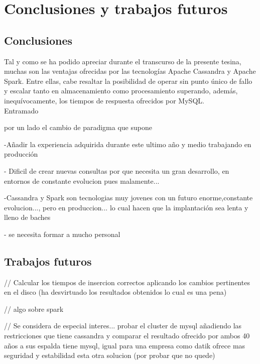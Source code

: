 
\pagestyle{fancy}

\chapter{Conclusiones y trabajos futuros}
\label{conclusiones}



\section{Conclusiones}

Tal y como se ha podido apreciar durante el transcurso de la presente tesina, muchas son las ventajas ofrecidas por las tecnologías Apache Cassandra y Apache Spark. Entre ellas, cabe resaltar la posibilidad de operar sin punto único de fallo y escalar tanto en almacenamiento como procesamiento superando, además, inequívocamente, los tiempos de respuesta ofrecidos por MySQL.\\

Entramado

por un lado el cambio de paradigma que supone

-Añadir la experiencia adquirida durante este ultimo año y medio trabajando en producción

- Dificil de crear nuevas consultas por que necesita un gran desarrollo, en entornos de constante evolucion pues malamente...

-Cassandra y Spark son tecnologias muy jovenes con un futuro enorme,constante evolucion..., pero en produccion... lo cual hacen que la implantación sea lenta y lleno de baches

- se necesita formar a mucho personal

\section{Trabajos futuros}

//
Calcular los tiempos de insercion correctos aplicando los cambios pertinentes en el disco (ha desvirtuado los resultados obtenidos lo cual es una pena)

// algo sobre spark

//
Se considera de especial interes... 
probar el cluster de mysql añadiendo las restricciones que tiene cassandra y comparar el resultado ofrecido por ambos
40 años a sus espalda tiene mysql, 
igual para una empresa como datik ofrece mas seguridad y estabilidad esta otra solucion (por probar que no quede)

